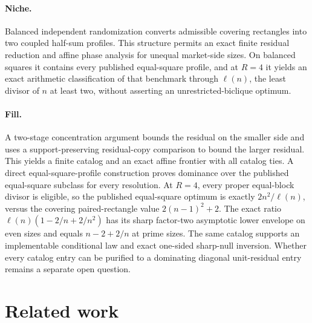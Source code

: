 \documentclass{article}
\begin{document}
\paragraph{Niche.} Balanced independent randomization converts admissible covering rectangles into two coupled half-sum profiles. This structure permits an exact finite residual reduction and affine phase analysis for unequal market-side sizes. On balanced squares it contains every published equal-square profile, and at \(R=4\) it yields an exact arithmetic classification of that benchmark through \(\ell(n)\), the least divisor of \(n\) at least two, without asserting an unrestricted-biclique optimum.

\paragraph{Fill.} A two-stage concentration argument bounds the residual on the smaller side and uses a support-preserving residual-copy comparison to bound the larger residual. This yields a finite catalog and an exact affine frontier with all catalog ties. A direct equal-square-profile construction proves dominance over the published equal-square subclass for every resolution. At \(R=4\), every proper equal-block divisor is eligible, so the published equal-square optimum is exactly \(2n^2/\ell(n)\), versus the covering paired-rectangle value \(2(n-1)^2+2\). The exact ratio \(\ell(n)(1-2/n+2/n^2)\) has its sharp factor-two asymptotic lower envelope on even sizes and equals \(n-2+2/n\) at prime sizes. The same catalog supports an implementable conditional law and exact one-sided sharp-null inversion. Whether every catalog entry can be purified to a dominating diagonal unit-residual entry remains a separate open question.

\section{Related work}
\end{document}
